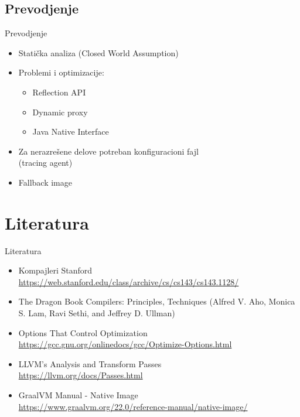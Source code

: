 \documentclass[compress, containsverbatim,mathserif, xcolor=dvipsnames, unicode]{beamer}
\begin{document}
\subsection{Prevodjenje}
\begin{frame}{Prevodjenje}
    \begin{itemize}
        \item Statička analiza (Closed World Assumption)
        \vspace{1em}
        \item Problemi i optimizacije:
        \begin{itemize}
            \item Reflection API
            \item Dynamic proxy
            \item Java Native Interface
        \end{itemize}        
        \vspace{1em}
        \item Za nerazrešene delove potreban konfiguracioni fajl \\ (tracing agent)
        \item Fallback image
    \end{itemize}
\end{frame}

\section{Literatura}
\begin{frame}{Literatura}
    \begin{itemize}
        \item Kompajleri Stanford \\ \scriptsize \url{https://web.stanford.edu/class/archive/cs/cs143/cs143.1128/}  \normalsize
        \item The Dragon Book Compilers: Principles, Techniques (Alfred V. Aho, Monica S. Lam, Ravi Sethi, and Jeffrey D. Ullman) \normalsize
        \item Options That Control Optimization \\ \scriptsize \url{https://gcc.gnu.org/onlinedocs/gcc/Optimize-Options.html} \normalsize
        \item LLVM's Analysis and Transform Passes \\ \scriptsize \url{https://llvm.org/docs/Passes.html} \normalsize
        \item GraalVM Manual - Native Image \\ \scriptsize \url{https://www.graalvm.org/22.0/reference-manual/native-image/} \normalsize
    \end{itemize}
\end{frame}
\end{document}
